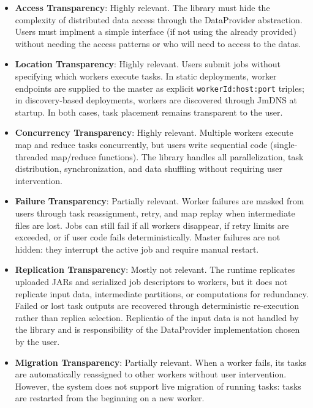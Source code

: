 \documentclass{scrartcl}
\begin{document}
\begin{itemize}
    \item \textbf{Access Transparency}: Highly relevant. The library must hide the complexity of distributed data access through the DataProvider abstraction. Users must implment a simple interface (if not using the already provided) without needing the access patterns or who will need to access to the datas.

    \item \textbf{Location Transparency}: Highly relevant. Users submit jobs without specifying which workers execute tasks. In static deployments, worker endpoints are supplied to the master as explicit \texttt{workerId:host:port} triples; in discovery-based deployments, workers are discovered through JmDNS at startup. In both cases, task placement remains transparent to the user.

    \item \textbf{Concurrency Transparency}: Highly relevant. Multiple workers execute map and reduce tasks concurrently, but users write sequential code (single-threaded map/reduce functions). The library handles all parallelization, task distribution, synchronization, and data shuffling without requiring user intervention.

    \item \textbf{Failure Transparency}: Partially relevant. Worker failures are masked from users through task reassignment, retry, and map replay when intermediate files are lost. Jobs can still fail if all workers disappear, if retry limits are exceeded, or if user code fails deterministically. Master failures are not hidden: they interrupt the active job and require manual restart.

    \item \textbf{Replication Transparency}: Mostly not relevant. The runtime replicates uploaded JARs and serialized job descriptors to workers, but it does not replicate input data, intermediate partitions, or computations for redundancy. Failed or lost task outputs are recovered through deterministic re-execution rather than replica selection. Replicatio of the input data is not handled by the library and is responsibility of the DataProvider implementation chosen by the user.

    \item \textbf{Migration Transparency}: Partially relevant. When a worker fails, its tasks are automatically reassigned to other workers without user intervention. However, the system does not support live migration of running tasks: tasks are restarted from the beginning on a new worker.
\end{itemize}
\end{document}
